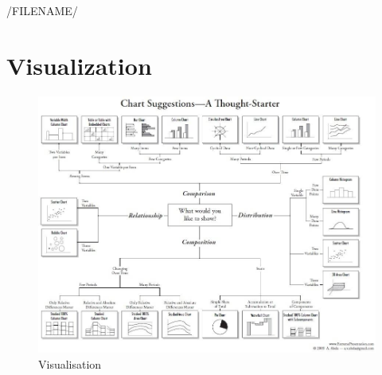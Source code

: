 /FILENAME/
\section{Visualization}

\begin{figure}
\centering
\includegraphics[width=\textwidth]{images/which-chart-when.jpeg}
\caption{Visualisation}
\end{figure}

